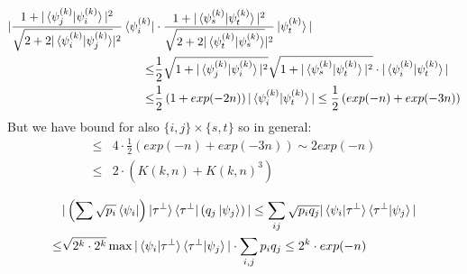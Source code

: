 \documentclass[manuscript,screen,review]{acmart}
\begin{document}
\begin{equation*}
  \begin{split}
     |\frac{ 1 + |\braket{\psi^{(k)}_{j}|\psi^{(k)}_{i}}|^2 }{ \sqrt{2 + 2 |\braket{\psi^{(k)}_{i}|\psi^{(k)}_{j}}}|^2 }\bra{\psi^{(k)}_{i}} & \cdot \frac{ 1 + |\braket{\psi^{(k)}_{s}|\psi^{(k)}_{t}}|^2 }{ \sqrt{2 + 2 |\braket{\psi^{(k)}_{t}|\psi^{(k)}_{s}}}|^2 }\ket{\psi^{(k)}_{t}} | \\ 
     \le &\frac{1}{2} \sqrt{1 + |\braket{\psi^{(k)}_{j}|\psi^{(k)}_{i}}|^2} \sqrt{1 + |\braket{\psi^{(k)}_{s}|\psi^{(k)}_{t}}|^2}\cdot | \braket{\psi^{(k)}_{i}|\psi^{(k)}_{t}} | \\
     \le & \frac{1}{2}\left(1+exp(-2n)\right)|\braket{\psi^{(k)}_{i}|\psi^{(k)}_{t}} | \le \frac{1}{2}\left( exp(-n) + exp(-3n) \right) 
  \end{split}
\end{equation*}
But we have bound for also $\{i,j\} \times \{s,t\}$ so in general: 
\begin{equation*}
  \begin{split}
    \le & 4 \cdot  \frac{1}{2}\left( exp(-n) + exp(-3n) \right) \sim 2exp(-n)  \\
    \le & 2 \cdot \left( K(k,n) + K(k,n)^{3} \right) 
  \end{split}
\end{equation*}

\begin{equation*}
  \begin{split}
    & | \left(\sum \sqrt{p_{i}} \bra{\psi_{i}}   \right)\ket{\tau^{\perp}}\bra{\tau^{\perp}} \left( q_{j} \ket{\psi_{j}}  \right) | \le \sum_{ij}\sqrt{p_{i}q_{j}}|\braket{\psi_{i}|\tau^{\perp}}\braket{\tau^{\perp}|\psi_{j}}| \\
    \le & \sqrt{2^{k}\cdot 2^{k}} \max |\braket{\psi_{i}|\tau^{\perp}}\braket{\tau^{\perp}|\psi_{j}}| \cdot \sum_{i,j}p_{i}q_{j} \le 2^{k}\cdot exp(-n)
   \end{split}
\end{equation*}
\end{document}
